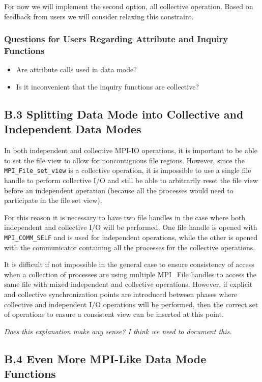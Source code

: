 \documentclass[10pt]{article}
\begin{document}
For now we will implement the second option, all collective operation.  Based
on feedback from users we will consider relaxing this constraint.

\subsubsection*{Questions for Users Regarding Attribute and Inquiry Functions}
\begin{itemize}
\item Are attribute calls used in data mode?
\item Is it inconvenient that the inquiry functions are collective?
\end{itemize}

\subsection*{B.3  Splitting Data Mode into Collective and Independent Data Modes}

In both independent and collective MPI-IO operations, it is important to be
able to set the file view to allow for noncontiguous file regions.  However,
since the \texttt{MPI\_File\_set\_view} is a collective operation, it is
impossible to use a single file handle to perform collective I/O and still be
able to arbitrarily reset the file view before an independent operation
(because all the processes would need to participate in the file set view).

For this reason it is necessary to have two file handles in the case where
both independent and collective I/O will be performed.  One file handle is
opened with \texttt{MPI\_COMM\_SELF} and is used for independent operations,
while the other is opened with the communicator containing all the processes
for the collective operations.

It is difficult if not impossible in the general case to ensure consistency of
access when a collection of processes are using multiple MPI\_File handles to
access the same file with mixed independent and collective operations.
However, if explicit and collective synchronization points are introduced
between phases where collective and independent I/O operations will be
performed, then the correct set of operations to ensure a consistent view can
be inserted at this point.

\emph{Does this explanation make any sense?  I think we need to document this.}

\subsection*{B.4  Even More MPI-Like Data Mode Functions}
\end{document}
